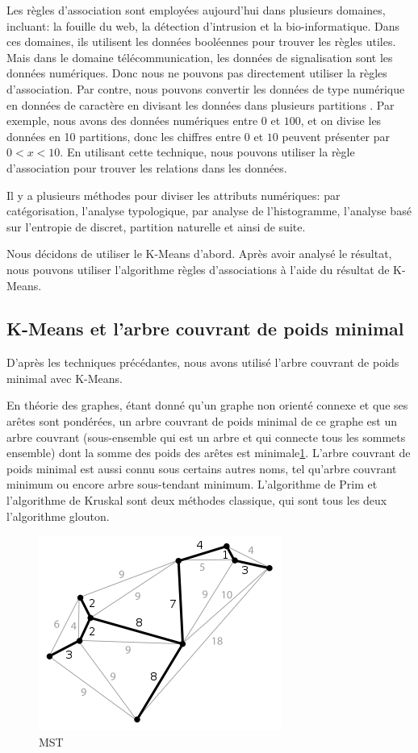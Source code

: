Les règles d'association sont employées aujourd'hui dans plusieurs domaines, incluant: la fouille du web, la détection d'intrusion et la bio-informatique.  Dans ces domaines, ils utilisent les données booléennes pour trouver les règles utiles. Mais dans le domaine télécommunication, les données de signalisation sont les données numériques. Donc nous ne pouvons pas directement utiliser la règles d'association. Par contre, nous pouvons convertir les données de type numérique en données de caractère en divisant les données dans plusieurs partitions \cite{AR}. Par exemple, nous avons des données numériques entre $0$ et $100$, et on divise les données en 10 partitions, donc les chiffres entre $0$ et $10$ peuvent présenter par $0<x<10$. En utilisant cette technique, nous pouvons utiliser la règle d'association pour trouver les relations dans les données.

 Il y a plusieurs méthodes pour diviser les attributs numériques: par catégorisation, l'analyse typologique, par analyse de l'histogramme, l'analyse basé sur l'entropie de discret, partition naturelle et ainsi de suite. 
 
 Nous décidons de utiliser le K-Means d'abord. Après avoir analysé le résultat, nous pouvons utiliser l'algorithme règles d'associations à l'aide du résultat de K-Means.

\subsection{K-Means et l'arbre couvrant de poids minimal }
D'après les techniques précédantes, nous avons utilisé l'arbre couvrant de poids minimal avec K-Means.

En théorie des graphes, étant donné qu'un graphe non orienté connexe et que ses arêtes sont pondérées, un arbre couvrant de poids minimal de ce graphe est un arbre couvrant (sous-ensemble qui est un arbre et qui connecte tous les sommets ensemble) dont la somme des poids des arêtes est minimale\ref{fig:mst}. L'arbre couvrant de poids minimal est aussi connu sous certains autres noms, tel qu'arbre couvrant minimum ou encore arbre sous-tendant minimum. L'algorithme de Prim et l'algorithme de Kruskal sont deux méthodes classique, qui sont tous les deux l'algorithme glouton. 

\begin{figure}[H]
\centering
\includegraphics[width=0.5\linewidth]{images/mst}
\caption{MST}
\label{fig:mst}
\end{figure}

